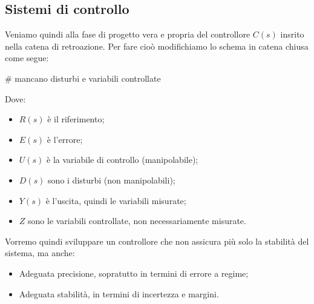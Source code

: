 \documentclass[a4paper,11pt]{article}
\begin{document}
\subsection{Sistemi di controllo}
Veniamo quindi alla fase di progetto vera e propria del controllore $C(s)$ insrito nella catena di retroazione.
Per fare cioò modifichiamo lo schema in catena chiusa come segue:
\begin{center}
\end{center}

# mancano disturbi e variabili controllate

Dove:
\begin{itemize}
	\item $R(s)$ è il riferimento;
	\item $E(s)$ è l'errore;
	\item $U(s)$ è la variabile di controllo (manipolabile);
	\item $D(s)$ sono i disturbi (non manipolabili);
	\item $Y(s)$ è l'uscita, quindi le variabili misurate;
	\item $Z$ sono le variabili controllate, non necessariamente misurate.
\end{itemize}

Vorremo quindi sviluppare un controllore che non assicura più solo la stabilità del sistema, ma anche:
\begin{itemize}
	\item Adeguata precisione, sopratutto in termini di errore a regime;
	\item Adeguata stabilità, in termini di incertezza e margini.
\end{itemize}
\end{document}
